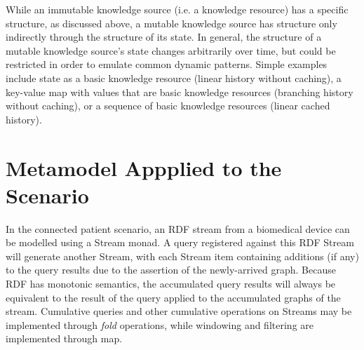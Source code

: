\documentclass[runningheads]{llncs}
\begin{document}
While an immutable knowledge source (i.e. a knowledge resource) has a specific structure, as discussed above, a mutable knowledge source has structure only indirectly through the structure of its state. In general, the structure of a mutable knowledge source's state changes arbitrarily over time, but could be restricted in order to emulate common dynamic patterns. Simple examples include state as a basic knowledge resource (linear history without caching), a key-value map with values that are basic knowledge resources (branching history without caching), or a sequence of basic knowledge resources (linear cached history). 



\vspace{-0.4cm}
\section{Metamodel Appplied to the Scenario}
\label{sec:proof}

In the connected patient scenario, an RDF stream from a biomedical device can be modelled using a Stream monad.
A query registered against this RDF Stream will generate another Stream, with each Stream item containing additions (if any) to the query results due to the assertion of the newly-arrived graph.
Because RDF has monotonic semantics, the accumulated query results will always be equivalent to the result of the query applied to the accumulated graphs of the stream.
Cumulative queries and other cumulative operations on Streams may be implemented through \emph{fold} operations, while windowing and filtering are implemented through map.
\end{document}
